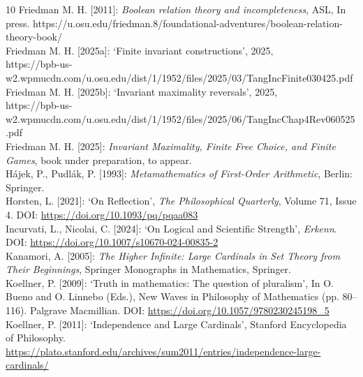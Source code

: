 \documentclass[a4paper,12pt]{amsart}
\theoremstyle{definition}
\numberwithin{equation}{section}
\begin{document}
\begin{thebibliography}{10}
Friedman M. H. [2011]: \emph{Boolean relation theory and incompleteness}, ASL, In press. https://u.osu.edu/friedman.8/foundational-adventures/boolean-relation-theory-book/\\
                                                                     
                                                                     
Friedman M. H. [2025a]: `Finite invariant constructions',  2025,\\
https://bpb-us-w2.wpmucdn.com/u.osu.edu/dist/1/1952/files/2025/03/TangIncFinite030425.pdf\\





Friedman M. H. [2025b]: `Invariant maximality reversals', 2025,\\ https://bpb-us-w2.wpmucdn.com/u.osu.edu/dist/1/1952/files/2025/06/TangIncChap4Rev060525.pdf\\


Friedman M. H. [2025]: \emph{Invariant Maximality, Finite Free Choice, and Finite Games},  book under preparation, to appear. \\

         
H\'{a}jek, P., Pudl\'{a}k, P. [1993]:  \emph{Metamathematics of First-Order Arithmetic}, Berlin: Springer.\\




Horsten, L. [2021]:  `On Reflection', \emph{The Philosophical Quarterly}, Volume 71, Issue 4.  DOI: \url{https://doi.org/10.1093/pq/pqaa083}\\


Incurvati, L., Nicolai, C. [2024]: `On Logical and Scientific Strength', \emph{Erkenn}. \\ DOI: \url{https://doi.org/10.1007/s10670-024-00835-2}\\
 
Kanamori, A. [2005]: \emph{The Higher Infinite: Large Cardinals in Set Theory from Their Beginnings}, Springer Monographs in Mathematics, Springer.\\ 


Koellner, P. [2009]: `Truth in mathematics: The question of pluralism', In O. Bueno and O. Linnebo (Eds.), New Waves in Philosophy of Mathematics (pp. 80–116). Palgrave Macmillian.   DOI: \url{https://doi.org/10.1057/9780230245198_5}\\

Koellner, P. [2011]: `Independence and Large Cardinals',  Stanford Encyclopedia of Philosophy. \url{https://plato.stanford.edu/archives/sum2011/entries/independence-large-cardinals/}\\
 

\end{thebibliography}
\end{document}
